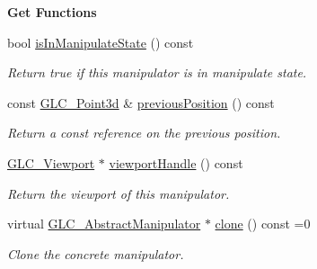\begin{Indent}{\bf Get Functions}\par
\begin{DoxyCompactItemize}
\item 
bool \hyperlink{class_g_l_c___abstract_manipulator_aceffd8928a6e22974e693c2d48499220}{is\-In\-Manipulate\-State} () const 
\begin{DoxyCompactList}\small\item\em Return true if this manipulator is in manipulate state. \end{DoxyCompactList}\item 
const \hyperlink{glc__vector3d_8h_a4e13a9bbc7ab3d34de7e98b41836772c}{G\-L\-C\-\_\-\-Point3d} \& \hyperlink{class_g_l_c___abstract_manipulator_a1376c6128eb89e9dd8017a12d15d3538}{previous\-Position} () const 
\begin{DoxyCompactList}\small\item\em Return a const reference on the previous position. \end{DoxyCompactList}\item 
\hyperlink{class_g_l_c___viewport}{G\-L\-C\-\_\-\-Viewport} $\ast$ \hyperlink{class_g_l_c___abstract_manipulator_ab07e2a2598c267d28faa2ec54e7f7443}{viewport\-Handle} () const 
\begin{DoxyCompactList}\small\item\em Return the viewport of this manipulator. \end{DoxyCompactList}\item 
virtual \hyperlink{class_g_l_c___abstract_manipulator}{G\-L\-C\-\_\-\-Abstract\-Manipulator} $\ast$ \hyperlink{class_g_l_c___abstract_manipulator_a7cd00c4173c63bbb3c1bd46b56ef793d}{clone} () const =0
\begin{DoxyCompactList}\small\item\em Clone the concrete manipulator. \end{DoxyCompactList}\end{DoxyCompactItemize}
\end{Indent}
